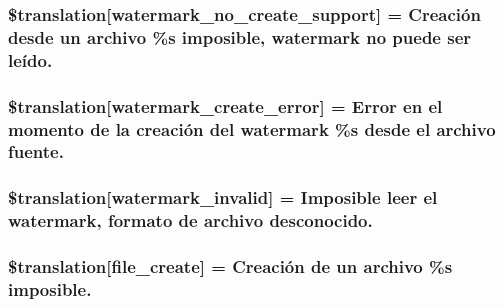 \subsubsection[{\$translation}]{\setlength{\rightskip}{0pt plus 5cm}\$translation\mbox{[}\textquotesingle{}watermark\+\_\+no\+\_\+create\+\_\+support\textquotesingle{}\mbox{]} = \textquotesingle{}Creación desde un archivo \%s imposible, watermark no puede ser leído.\textquotesingle{}}\label{class_8upload_8es___e_s_8php_a82d5853430ab72dc1f9799ec36144cc6}
\hypertarget{class_8upload_8es___e_s_8php_aabca0b65dadbc6184415c16375f284ca}{}
\subsubsection[{\$translation}]{\setlength{\rightskip}{0pt plus 5cm}\$translation\mbox{[}\textquotesingle{}watermark\+\_\+create\+\_\+error\textquotesingle{}\mbox{]} = \textquotesingle{}Error en el momento de la creación del watermark \%s desde el archivo fuente.\textquotesingle{}}\label{class_8upload_8es___e_s_8php_aabca0b65dadbc6184415c16375f284ca}
\hypertarget{class_8upload_8es___e_s_8php_ac336e7a5701e47ba4a05e9e498a3cc44}{}
\subsubsection[{\$translation}]{\setlength{\rightskip}{0pt plus 5cm}\$translation\mbox{[}\textquotesingle{}watermark\+\_\+invalid\textquotesingle{}\mbox{]} = \textquotesingle{}Imposible leer el watermark, formato de archivo desconocido.\textquotesingle{}}\label{class_8upload_8es___e_s_8php_ac336e7a5701e47ba4a05e9e498a3cc44}
\hypertarget{class_8upload_8es___e_s_8php_a1ecb4673e4fb69e06b3f20b65cecf30a}{}
\subsubsection[{\$translation}]{\setlength{\rightskip}{0pt plus 5cm}\$translation\mbox{[}\textquotesingle{}file\+\_\+create\textquotesingle{}\mbox{]} = \textquotesingle{}Creación de un archivo \%s imposible.\textquotesingle{}}\label{class_8upload_8es___e_s_8php_a1ecb4673e4fb69e06b3f20b65cecf30a}
\hypertarget{class_8upload_8es___e_s_8php_a4712d7ec28e9a7f17eb3338af2358363}{}
